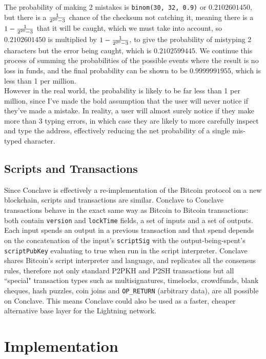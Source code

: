 \documentclass{report}
\begin{document}
			 The probability of making 2 mistakes is \texttt{binom(30, 32, 0.9)} or $0.2102601450$, but there is a $1\over{2^{20} - 3}$ chance of the checksum not catching it, meaning there is a $1 - {1\over{2^{20} -3}}$ that it will be caught, which we must take into account, so $0.2102601450$ is multiplied by $1 - {1\over{2^{20} -3}}$, to give the probability of mistyping 2 characters but the error being caught, which is $0.2102599445$. We continue this process of summing the probabilities of the possible events where the result is no loss in funds, and the final probability can be shown to be $0.9999991955$, which is less than 1 per million. \\
			 
			 However in the real world, the probability is likely to be far less than 1 per million, since I've made the bold assumption that the user will never notice if they've made a mistake. In reality, a user will almost surely notice if they make more than 3 typing errors, in which case they are likely to more carefully inspect and type the address, effectively reducing the net probability of a single mis-typed character. \\
			 
			 
			 
		\subsection{Scripts and Transactions}
			Since Conclave is effectively a re-implementation of the Bitcoin protocol on a new blockchain, scripts and transactions are similar. Conclave to Conclave transactions behave in the exact same way as Bitcoin to Bitcoin transactions: both contain \texttt{version} and \texttt{lockTime} fields, a set of inputs and a set of outputs. Each input spends an output in a previous transaction and that spend depends on the concatenation of the input's \texttt{scriptSig} with the output-being-spent's \texttt{scriptPubKey} evaluating to true when run in the script interpreter. Conclave shares Bitcoin's script interpreter and language, and replicates all the consensus rules, therefore not only standard P2PKH and P2SH transactions but all ``special" transaction types such as multisignatures, timelocks,  crowdfunds,  blank cheques, hash puzzles, coin joins and \texttt{OP\_RETURN} (arbitrary data), are all possible on Conclave. This means Conclave could also be used as a faster, cheaper alternative base layer for the Lightning network.
			\newpage
	\section{Implementation}
\end{document}
